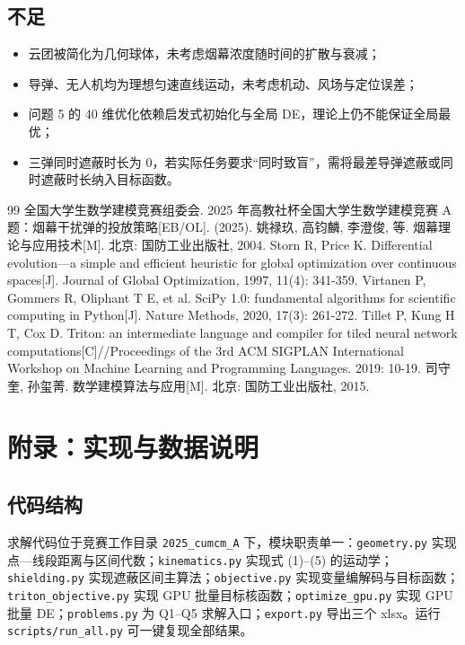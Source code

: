 \documentclass[11pt,a4paper]{ctexart}
\begin{document}
\subsection{不足}
\begin{itemize}
  \item 云团被简化为几何球体，未考虑烟幕浓度随时间的扩散与衰减；
  \item 导弹、无人机均为理想匀速直线运动，未考虑机动、风场与定位误差；
  \item 问题 5 的 40 维优化依赖启发式初始化与全局 DE，理论上仍不能保证全局最优；
  \item 三弹同时遮蔽时长为 0，若实际任务要求“同时致盲”，需将最差导弹遮蔽或同时遮蔽时长纳入目标函数。
\end{itemize}

\begin{thebibliography}{99}
 全国大学生数学建模竞赛组委会. 2025 年高教社杯全国大学生数学建模竞赛 A 题：烟幕干扰弹的投放策略[EB/OL]. (2025).
 姚禄玖, 高钧麟, 李澄俊, 等. 烟幕理论与应用技术[M]. 北京: 国防工业出版社, 2004.
 Storn R, Price K. Differential evolution—a simple and efficient heuristic for global optimization over continuous spaces[J]. Journal of Global Optimization, 1997, 11(4): 341-359.
 Virtanen P, Gommers R, Oliphant T E, et al. SciPy 1.0: fundamental algorithms for scientific computing in Python[J]. Nature Methods, 2020, 17(3): 261-272.
 Tillet P, Kung H T, Cox D. Triton: an intermediate language and compiler for tiled neural network computations[C]//Proceedings of the 3rd ACM SIGPLAN International Workshop on Machine Learning and Programming Languages. 2019: 10-19.
 司守奎, 孙玺菁. 数学建模算法与应用[M]. 北京: 国防工业出版社, 2015.
\end{thebibliography}

\appendix
\section{附录：实现与数据说明}

\subsection{代码结构}

求解代码位于竞赛工作目录 \texttt{2025\_cumcm\_A} 下，模块职责单一：\texttt{geometry.py} 实现点—线段距离与区间代数；\texttt{kinematics.py} 实现式 (1)--(5) 的运动学；\texttt{shielding.py} 实现遮蔽区间主算法；\texttt{objective.py} 实现变量编解码与目标函数；\texttt{triton\_objective.py} 实现 GPU 批量目标核函数；\texttt{optimize\_gpu.py} 实现 GPU 批量 DE；\texttt{problems.py} 为 Q1--Q5 求解入口；\texttt{export.py} 导出三个 xlsx。运行 \texttt{scripts/run\_all.py} 可一键复现全部结果。
\end{document}
